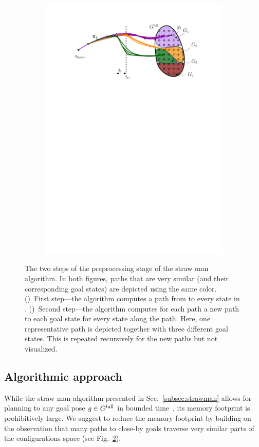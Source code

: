 \documentclass[conference]{IEEEtran}
\begin{document}
\begin{figure}[t]
\begin{subfigure}{0.225\textwidth}
        \includegraphics[width=\textwidth]{naive2}
        \caption{}
        \label{fig:naive2}
    \end{subfigure}
    \caption{The two steps of the preprocessing stage of the straw man algorithm. In both figures, paths that are very similar (and their corresponding goal states) are depicted using the same color.
    ()~First step---the algorithm computes a path from \Shome to every state in \Gfull.
    ()~Second step---the algorithm computes for each path a new path to each goal state for every state along the path. Here, one representative path is depicted together with three different goal states. 
    This is repeated recursively for the new paths but not visualized.}
    \label{fig:naive}
\end{figure}

\subsection{Algorithmic approach}
While the straw man algorithm presented in Sec.~\ref{subsec:strawman} allows for planning to any goal pose $ g \in G^{\textrm{full}}$ in bounded time~\Tbound, its memory footprint is prohibitively large.
%
We suggest to reduce the memory footprint by building on the observation that many paths to close-by goals traverse very similar parts of the configurations space (see Fig.~\ref{fig:naive}).
\end{document}
